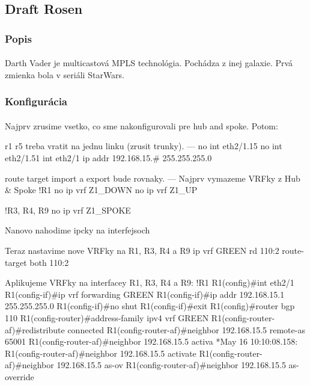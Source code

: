 \documentclass[12pt,twoside,a4paper]{report}
\begin{document}
\subsection{Draft Rosen}
\subsubsection{Popis}
\paragraph{}
Darth Vader je multicastová MPLS technológia. Pochádza z inej galaxie. Prvá zmienka bola v seriáli StarWars.

\subsubsection{Konfigurácia}
\paragraph{}
Najprv zrusime vsetko, co sme nakonfigurovali pre hub and spoke. Potom:

r1 r5 treba vratit na jednu linku (zrusit trunky). 
---
no int eth2/1.15
no int eth2/1.51
int eth2/1
ip addr 192.168.15.# 255.255.255.0





route target import a export bude rovnaky.
---
Najprv vymazeme VRFky z Hub & Spoke
!R1
no ip vrf Z1_DOWN
no ip vrf Z1_UP

!R3, R4, R9
no ip vrf Z1_SPOKE

Nanovo nahodime ipcky na interfejsoch

Teraz nastavime nove VRFky na R1, R3, R4 a R9
ip vrf GREEN
rd 110:2
route-target both 110:2


Aplikujeme VRFky na interfacey R1, R3, R4 a R9:
!R1
R1(config)#int eth2/1
R1(config-if)#ip vrf forwarding GREEN
R1(config-if)#ip addr 192.168.15.1 255.255.255.0
R1(config-if)#no shut
R1(config-if)#exit
R1(config)#router bgp 110          
R1(config-router)#address-family ipv4 vrf GREEN
R1(config-router-af)#redistribute connected
R1(config-router-af)#neighbor 192.168.15.5 remote-as 65001
R1(config-router-af)#neighbor 192.168.15.5 activa         
*May 16 10:10:08.158: %
R1(config-router-af)#neighbor 192.168.15.5 activate
R1(config-router-af)#neighbor 192.168.15.5 as-ov   
R1(config-router-af)#neighbor 192.168.15.5 as-override
\end{document}
